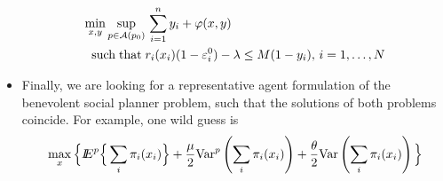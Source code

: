 \begin{itemize}
\begin{align}\label{formr1}
\min_{x,y}\sup_{p\in{\cal A}(p_0)}&\,\sum_{i=1}^n y_i+\varphi(x,y)\\
\mathop{\rm \;such\; that\;}\nolimits&r_i(x_i)(1-\varepsilon^0_i)-\lambda\leq M(1-y_i),\,i=1,\ldots,N
\end{align}
\item Finally, we are looking for a representative agent formulation of the benevolent social planner problem, such that the solutions of both problems coincide.  For example, one wild guess is \cite{?}
\[\max_x\Big\lbrace {I\kern-.35em E}^p\Big\lbrace\sum_i \pi_i(x_i)\Big\rbrace +\frac{\mu}{2}{\rm Var}^p\left(\sum_i \pi_i(x_i)\right)+\frac{\theta}{2}{\rm Var}\left(\sum_i \pi_i(x_i)\right)\Big\rbrace\] 
\end{itemize}